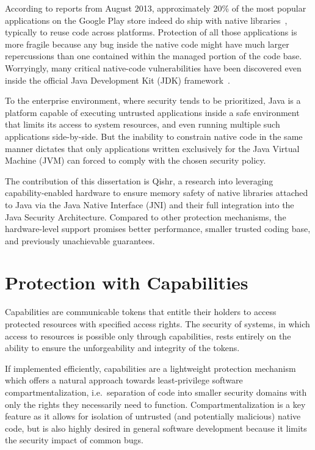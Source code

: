 \documentclass[a4paper,12pt,twoside,openright]{report}
\begin{document}
According to reports from August 2013, approximately 20\% of the most popular applications on the Google Play store indeed do ship with native libraries~\cite{poeplau2014execute}, typically to reuse code across platforms. Protection of all those applications is more fragile because any bug inside the native code might have much larger repercussions than one contained within the managed portion of the code base. Worryingly, many critical native-code vulnerabilities have been discovered even inside the official Java Development Kit (JDK) framework~\cite{Tan:2008:ESS:1496711.1496736}.

To the enterprise environment, where security tends to be prioritized, Java is a platform capable of executing untrusted applications inside a safe environment that limits its access to system resources, and even running multiple such applications side-by-side. But the inability to constrain native code in the same manner dictates that only applications written exclusively for the Java Virtual Machine (JVM) can forced to comply with the chosen security policy.
 
The contribution of this dissertation is Qishr, a research into leveraging capability-enabled hardware to ensure memory safety of native libraries attached to Java via the Java Native Interface (JNI) and their full integration into the Java Security Architecture. Compared to other protection mechanisms, the hardware-level support promises better performance, smaller trusted coding base, and previously unachievable guarantees.

\section{Protection with Capabilities}

Capabilities are communicable tokens that entitle their holders to access protected resources with specified access rights. The security of systems, in which access to resources is possible only through capabilities, rests entirely on the ability to ensure the unforgeability and integrity of the tokens.
 
If implemented efficiently, capabilities are a lightweight protection mechanism which offers a natural approach towards least-privilege software compartmentalization, i.e.\ separation of code into smaller security domains with only the rights they necessarily need to function. Compartmentalization is a key feature as it allows for isolation of untrusted (and potentially malicious) native code, but is also highly desired in general software development because it limits the security impact of common bugs.
\end{document}
